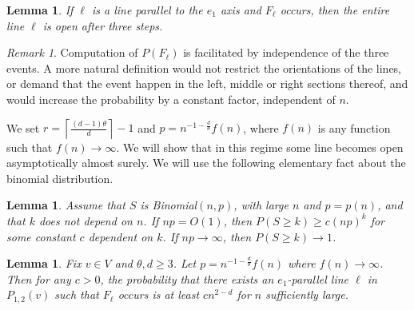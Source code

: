 \documentclass{amsart}
\newcommand{\threshold}{\theta}
\newcommand{\noodle}{r}
\newcommand{\I}[2]{\hbox{Initial}\left(#1, \geq #2\right)}
\numberwithin{equation}{section}
\newcommand{\Ln}{\ell}
\newtheorem{lemma}[theorem]{Lemma}
\theoremstyle{definition}
\theoremstyle{remark}
\newtheorem{remark}[theorem]{Remark}
\begin{document}
\begin{lemma} \label{twostep}
If $\Ln$ is a line parallel to the $e_1$ axis and $F_\Ln$ occurs,
then the entire line $\Ln$ is open after three steps.
\end{lemma}
\begin{comment}
\begin{proof}
If $v \in \Ln_m$ 
and the event
$$\I{\Ln_l}{\noodle}\bigcap\I{\Ln_2(v)}{\threshold-\noodle}$$
occurs then $v$ has at least $\threshold$ neighbors initially open and $v$ is open after one step. Then there are at least $\noodle +1$ sites open in $\Ln_l \cup \Ln_m$ after one step. Thus if $F_\Ln$
occurs there are at least $\threshold$ vertices in $\Ln_r$ that are
open after two steps. Thus the entire line $\Ln$ is open after 
three steps.
\end{proof}
\end{comment}

\begin{remark} Computation of 
$P(F_\Ln)$ is facilitated by independence of the three events. 
A more natural definition would not restrict the orientations of the lines, or 
demand that the event happen in the left, middle or right sections thereof, and would increase the probability by a constant factor, independent of $n$.
\end{remark}


We set $\noodle =\left\lceil \frac{(d-1)\threshold}{d} \right\rceil -1$ and  $p = n^{-1-\frac{d}{\threshold}}f(n)$, where $f(n)$ is any function such that $f(n) \to \infty$. 
We will show that in this regime some line becomes open asymptotically almost surely.
We will use the following elementary fact about the binomial distribution. 

\begin{lemma} \label{binomlemma}
Assume that $S$ is Binomial$(n,p)$, with large $n$ and $p=p(n)$, and that $k$ does not depend on $n$. 
If $np=O(1)$, then $P(S\ge k)\ge c (np)^k$ for some constant $c$ dependent on $k$. 
If $np\to\infty$, then  $P(S\ge k)\to 1$.
\end{lemma}



\begin{lemma} \label{probA}
Fix $v \in V$ and $ \threshold, d \geq 3$. Let $p=n^{-1-\frac{d}{\threshold}}f(n)$ where $f(n) \to \infty$. Then for any $c>0$, the probability that there exists an $e_1$-parallel line $\Ln$ in $P_{1,2}(v)$ such that $F_\Ln$ occurs
is at least  $cn^{2-d}$ for $n$ sufficiently large.
\end{lemma}
\end{document}
